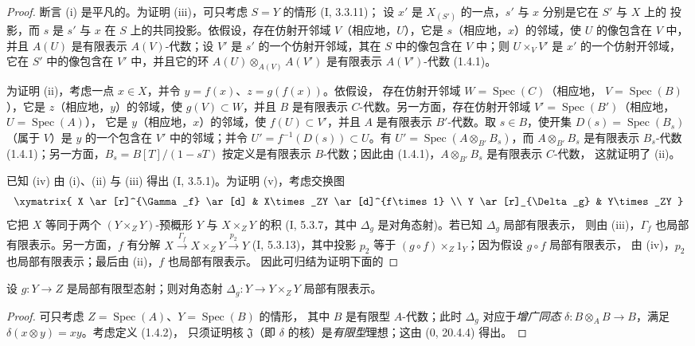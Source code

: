 \begin{proof}
断言 (i) 是平凡的。为证明 (iii)，可只考虑 $S=Y$ 的情形 (I, 3.3.11)；
设 $x'$ 是 $X_{(S')}$ 的一点，$s'$ 与 $x$ 分别是它在 $S'$ 与 $X$ 上的
投影，而 $s$ 是 $s'$ 与 $x$ 在 $S$ 上的共同投影。依假设，存在仿射开邻域
$V$（相应地，$U$），它是 $s$（相应地，$x$）的邻域，使 $U$
的像包含在 $V$ 中，并且 $A(U)$ 是有限表示 $A(V)$-代数；设 $V'$ 是
$s'$ 的一个仿射开邻域，其在 $S$ 中的像包含在 $V$ 中；则
$U\times_VV'$ 是 $x'$ 的一个仿射开邻域，它在 $S'$ 中的像包含在 $V'$
中，并且它的环 $A(U)\otimes_{A(V)}A(V')$ 是有限表示 $A(V')$-代数
(1.4.1)。

为证明 (ii)，考虑一点 $x\in X$，并令 $y=f(x)$、$z=g(f(x))$。依假设，
存在仿射开邻域 $W=\operatorname{Spec}(C)$（相应地，
$V=\operatorname{Spec}(B)$），它是 $z$（相应地，$y$）的邻域，使
$g(V)\subset W$，并且
$B$ 是有限表示 $C$-代数。另一方面，存在仿射开邻域
$V'=\operatorname{Spec}(B')$（相应地，$U=\operatorname{Spec}(A)$），
它是 $y$（相应地，$x$）的邻域，使 $f(U)\subset V'$，并且 $A$ 是有限表示
$B'$-代数。取 $s\in B$，使开集 $D(s)=\operatorname{Spec}(B_s)$（属于
$V$）是 $y$ 的一个包含在 $V'$ 中的邻域；并令
$U'=f^{-1}(D(s))\subset U$。有
$U'=\operatorname{Spec}(A\otimes_{B'}B_s)$，而 $A\otimes_{B'}B_s$ 是有限表示
$B_s$-代数 (1.4.1)；另一方面，$B_s=B[T]/(1-sT)$ 按定义是有限表示
$B$-代数；因此由 (1.4.1)，$A\otimes_{B'}B_s$ 是有限表示 $C$-代数，
这就证明了 (ii)。

已知 (iv) 由 (i)、(ii) 与 (iii) 得出 (I, 3.5.1)。为证明 (v)，考虑交换图
\[
\xymatrix{
X \ar[r]^{\Gamma_f} \ar[d] & X\times_ZY \ar[d]^{f\times 1} \\
Y \ar[r]_{\Delta_g} & Y\times_ZY
}
\]
它把 $X$ 等同于两个 $(Y\times_ZY)$-预概形 $Y$ 与 $X\times_ZY$ 的积
(I, 5.3.7，其中 $\Delta_g$ 是对角态射)。若已知 $\Delta_g$ 局部有限表示，
则由 (iii)，$\Gamma_f$ 也局部有限表示。另一方面，$f$ 有分解
$X\xrightarrow{\Gamma_f}X\times_ZY\xrightarrow{p_2}Y$ (I, 5.3.13)，其中投影
$p_2$ 等于 $(g\circ f)\times_Z1_Y$；因为假设 $g\circ f$ 局部有限表示，
由 (iv)，$p_2$ 也局部有限表示；最后由 (ii)，$f$ 也局部有限表示。
因此可归结为证明下面的
\end{proof}

\begin{corollary}[1.4.3.1]
\label{IV.1.4.3.1-fr}
设 $g:Y\to Z$ 是局部有限型态射；则对角态射
$\Delta_g:Y\to Y\times_ZY$ 局部有限表示。
\end{corollary}


\begin{proof}
可只考虑 $Z=\operatorname{Spec}(A)$、$Y=\operatorname{Spec}(B)$ 的情形，
其中 $B$ 是有限型 $A$-代数；此时 $\Delta_g$ 对应于\emph{增广同态}
$\delta:B\otimes_AB\to B$，满足 $\delta(x\otimes y)=xy$。考虑定义 (1.4.2)，
只须证明核 $\mathfrak J$（即 $\delta$ 的核）是\emph{有限型}理想；这由
(0, 20.4.4) 得出。
\end{proof}

